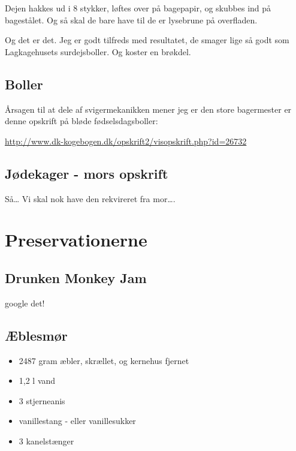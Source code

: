 \documentclass[
]{book}
\providecommand{\tightlist}{%
  \setlength{\itemsep}{0pt}\setlength{\parskip}{0pt}}
\begin{document}
Dejen hakkes ud i 8 stykker, løftes over på bagepapir, og skubbes ind på bagestålet. Og så skal de bare have til de er lysebrune på overfladen.

Og det er det. Jeg er godt tilfreds med resultatet, de smager lige så godt som Lagkagehusets surdejsboller. Og koster en brøkdel.

\hypertarget{boller}{%
\section{Boller}\label{boller}}

Årsagen til at dele af svigermekanikken mener jeg er den store bagermester er denne opskrift på bløde fødselsdagsboller:

\url{http://www.dk-kogebogen.dk/opskrift2/visopskrift.php?id=26732}

\hypertarget{juxf8dekager---mors-opskrift}{%
\section{Jødekager - mors opskrift}\label{juxf8dekager---mors-opskrift}}

Så\ldots{} Vi skal nok have den rekvireret fra mor\ldots.

\hypertarget{preservationerne}{%
\chapter{Preservationerne}\label{preservationerne}}

\hypertarget{drunken-monkey-jam}{%
\section{Drunken Monkey Jam}\label{drunken-monkey-jam}}

google det!

\hypertarget{uxe6blesmuxf8r}{%
\section{Æblesmør}\label{uxe6blesmuxf8r}}

\begin{itemize}
\tightlist
\item
  2487 gram æbler, skrællet, og kernehus fjernet
\item
  1,2 l vand
\item
  3 stjerneanis
\item
  vanillestang - eller vanillesukker
\item
  3 kanelstænger
\end{itemize}
\end{document}
